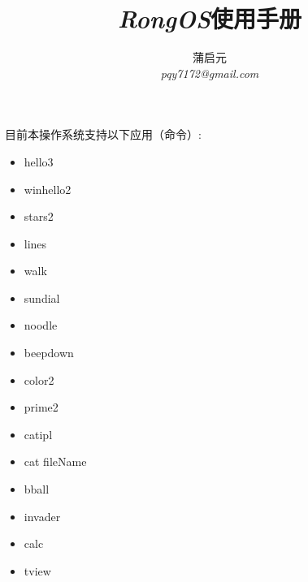 \documentclass{wx672article} %
\title{\emph{RongOS}使用手册}
\author{蒲启元 \\
\emph{pqy7172@gmail.com}}
\begin{document}
\maketitle{}
目前本操作系统支持以下应用（命令）:
\begin{itemize}
\item hello3
\item winhello2
\item stars2
\item lines
\item walk
\item sundial
\item noodle
\item beepdown
\item color2
\item prime2
\item catipl
\item cat fileName
\item bball
\item invader
\item calc
\item tview
  
\end{itemize}
\end{document}
